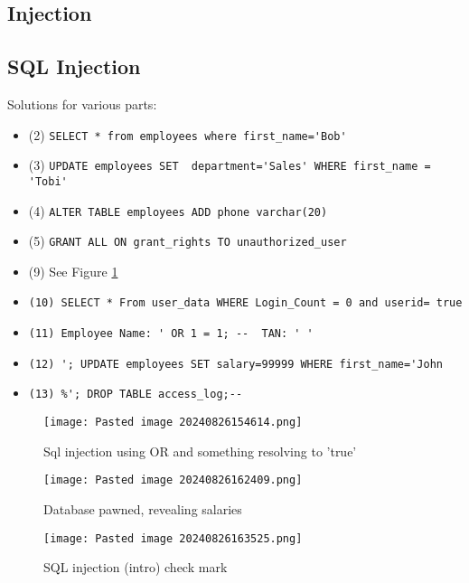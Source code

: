 \documentclass[
	letterpaper, %
	10pt, %
	unnumberedsections, %
	twoside, %
]{APAAssignment}
\begin{document}
\begin{appendices}
\clearpage

\section{Injection}
\subsection{SQL Injection}
Solutions for various parts:

\begin{itemize}
\item (2) \verb $SELECT * from employees where first_name='Bob'$
\item (3) \verb $UPDATE employees SET  department='Sales' WHERE first_name = 'Tobi'$
\item (4) \verb $ALTER TABLE employees ADD phone varchar(20)$
\item (5) \verb $GRANT ALL ON grant_rights TO unauthorized_user$
\item (9) See Figure \ref{fig:InjectionIntro9}
\item \verb $(10) SELECT * From user_data WHERE Login_Count = 0 and userid= true$
\item \verb $(11) Employee Name: ' OR 1 = 1; --  TAN: ' '$
\item \verb $(12) '; UPDATE employees SET salary=99999 WHERE first_name='John$
\item \verb $(13) %
\end{itemize}

\begin{figure} %
	\centering
	\texttt{[image: Pasted image 20240826154614.png]}
	\caption{Sql injection using OR and something resolving to 'true' }
	\label{fig:InjectionIntro9}
\end{figure}


\begin{figure} %
	\centering
	\texttt{[image: Pasted image 20240826162409.png]}
	\caption{Database pawned, revealing salaries}
	\label{fig:SalaryList}
\end{figure}




\begin{figure} %
	\centering
	\texttt{[image: Pasted image 20240826163525.png]}
	\caption{SQL injection (intro) check mark}
	\label{fig:InjectionIntroSolvedCheck}
\end{figure}


\end{appendices}
\end{document}
